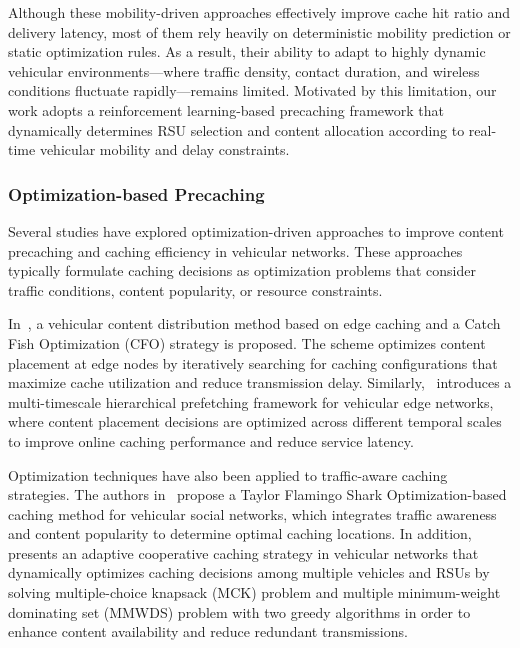 Although these mobility-driven approaches effectively improve cache hit ratio and delivery latency, most of them rely heavily on deterministic mobility prediction or static optimization rules. 
As a result, their ability to adapt to highly dynamic vehicular environments—where traffic density, contact duration, and wireless conditions fluctuate rapidly—remains limited. 
Motivated by this limitation, our work adopts a reinforcement learning-based precaching framework that dynamically determines RSU selection and content allocation according to real-time vehicular mobility and delay constraints.





\subsubsection{Optimization-based Precaching}
\label{subsubsec:rw_optimization_precaching}

Several studies have explored optimization-driven approaches to improve content precaching and caching efficiency in vehicular networks. These approaches typically formulate caching decisions as optimization problems that consider traffic conditions, content popularity, or resource constraints.

In~\cite{CatchFishCaching}, a vehicular content distribution method based on edge caching and a Catch Fish Optimization (CFO) strategy is proposed. The scheme optimizes content placement at edge nodes by iteratively searching for caching configurations that maximize cache utilization and reduce transmission delay. Similarly,~\cite{Multi-timescale} introduces a multi-timescale hierarchical prefetching framework for vehicular edge networks, where content placement decisions are optimized across different temporal scales to improve online caching performance and reduce service latency.

Optimization techniques have also been applied to traffic-aware caching strategies. The authors in~\cite{TaylorFlamingoCaching} propose a Taylor Flamingo Shark Optimization-based caching method for vehicular social networks, which integrates traffic awareness and content popularity to determine optimal caching locations. In addition,~\cite{AdaptiveCooperativeCaching} presents an adaptive cooperative caching strategy in vehicular networks that dynamically optimizes caching decisions among multiple vehicles and RSUs by solving multiple-choice knapsack (MCK) problem and multiple minimum-weight dominating set (MMWDS) problem with two greedy algorithms in order to enhance content availability and reduce redundant transmissions.

